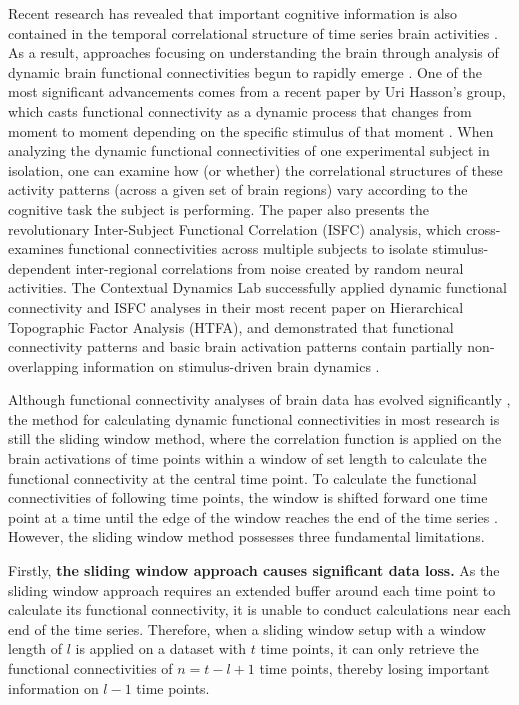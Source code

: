 \documentclass[11pt]{article}
\begin{document}
Recent research has revealed that important cognitive information is also contained in the temporal correlational structure of time series brain activities \citep{davidson2016}. As a result, approaches focusing on understanding the brain through analysis of dynamic brain functional connectivities begun to rapidly emerge \citep{Nigam2016,Hutchinson2013}. One of the most significant advancements comes from a recent paper by Uri Hasson's group, which casts functional connectivity as a dynamic process that changes from moment to moment depending on the specific stimulus of that moment \citep{hasson2016}. When analyzing the dynamic functional connectivities of one experimental subject in isolation, one can examine how (or whether) the correlational structures of these activity patterns (across a given set of brain regions) vary according to the cognitive task the subject is performing. The paper also presents the revolutionary Inter-Subject Functional Correlation (ISFC) analysis, which cross-examines functional connectivities across multiple subjects to isolate stimulus-dependent inter-regional correlations from noise created by random neural activities. The Contextual Dynamics Lab successfully applied dynamic functional connectivity and ISFC analyses in their most recent paper on Hierarchical Topographic Factor Analysis (HTFA), and demonstrated that functional connectivity patterns and basic brain activation patterns contain partially non-overlapping information on stimulus-driven brain dynamics \citep{jeremy2017}.

Although functional connectivity analyses of brain data has evolved significantly \citep{olaf2005,khambhati2017}, the method for calculating dynamic functional connectivities in most research is still the sliding window method, where the correlation function is applied on the brain activations of time points within a window of set length to calculate the functional connectivity at the central time point. To calculate the functional connectivities of following time points, the window is shifted forward one time point at a time until the edge of the window reaches the end of the time series \citep{enrico2011,elena2012}. However, the sliding window method possesses three fundamental limitations.

Firstly, \textbf{the sliding window approach causes significant data loss.} As the sliding window approach requires an extended buffer around each time point to calculate its functional connectivity, it is unable to conduct calculations near each end of the time series. Therefore, when a sliding window setup with a window length of $l$ is applied on a dataset with $t$ time points, it can only retrieve the functional connectivities of $n=t-l+1$ time points, thereby losing important information on $l-1$ time points.
\end{document}
